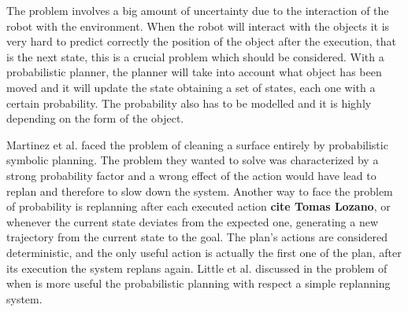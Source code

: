 The problem involves a big amount of uncertainty due to the interaction of the robot with the environment. When the robot will interact with the objects it is very hard to predict correctly the position of the object after the execution, that is the next state, this is a crucial problem which should be considered. With a probabilistic planner, the planner will take into account what object has been moved and it will update the state obtaining a set of states, each one with a certain probability. The probability also has to be modelled and it is highly depending on the form of the object.

Martinez et al. \citep{martinez2015planning} faced the problem of cleaning a surface entirely by probabilistic symbolic planning. The problem they wanted to solve was characterized by a strong probability factor and a wrong effect of the action would have lead to replan and therefore to slow down the system.
Another way to face the problem of probability is replanning after each executed action \textbf{cite Tomas Lozano}, or whenever the current state deviates from the expected one, generating a new trajectory from the current state to the goal. The plan's actions are considered deterministic, and the only useful action is actually the first one of the plan, after its execution the system replans again. Little et al. discussed in \cite{little2007probabilistic} the problem of when is more useful the probabilistic planning with respect a simple replanning system. 

